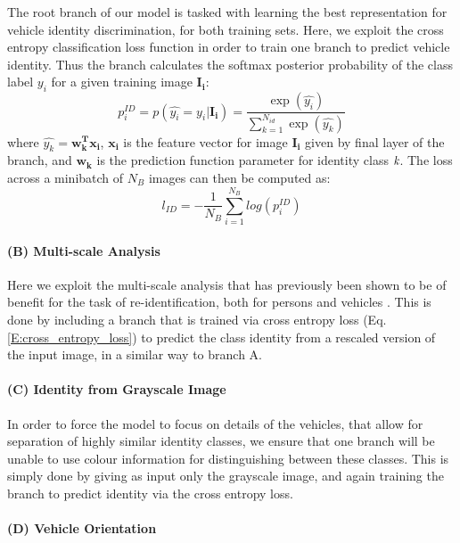 \documentclass[10pt,twocolumn,letterpaper]{article}
\begin{document}
The root branch of our model is tasked with learning the best representation for vehicle identity discrimination, for both training sets. Here, we exploit the cross entropy classification loss function in order to train one branch to predict vehicle identity. Thus the branch calculates the softmax posterior probability of the class label $y_i$ for a given training image $\mathbf{I_i}$:
\begin{equation}
  p_i^{ID} = p(\hat{y_i} = y_i|\mathbf{I_i}) = \frac{\exp(\hat{y_i})}{\sum_{k=1}^{N_{id}}\exp(\hat{y_k})}
  \label{E:softmax_id}
\end{equation}
where $\hat{y_k} = \mathbf{w_k^Tx_i}$, $\mathbf{x_i}$ is the feature vector for image $\mathbf{I_i}$ given by final layer of the branch, and $\mathbf{w_k}$ is the prediction function parameter for identity class $\emph{k}$. The loss across a minibatch of $N_B$ images can then be computed as:
\begin{equation}
  l_{ID} = -\frac{1}{N_B} \sum_{i=1}^{N_B} log(p_i^{ID})
  \label{E:cross_entropy_loss}
\end{equation}

\paragraph{(B) Multi-scale Analysis}

Here we exploit the multi-scale analysis that has previously been shown to be of benefit for the task of re-identification, both for persons \cite{chen2017person} and vehicles \cite{kanaci2018vehicle}. This is done by including a branch that is trained via cross entropy loss (Eq. \ref{E:cross_entropy_loss}) to predict the class identity from a rescaled version of the input image, in a similar way to branch A.

\paragraph{(C) Identity from Grayscale Image}

In order to force the model to focus on details of the vehicles, that allow for separation of highly similar identity classes, we ensure that one branch will be unable to use colour information for distinguishing between these classes. This is simply done by giving as input only the grayscale image, and again training the branch to predict identity via the cross entropy loss.

\paragraph{(D) Vehicle Orientation}
\end{document}
